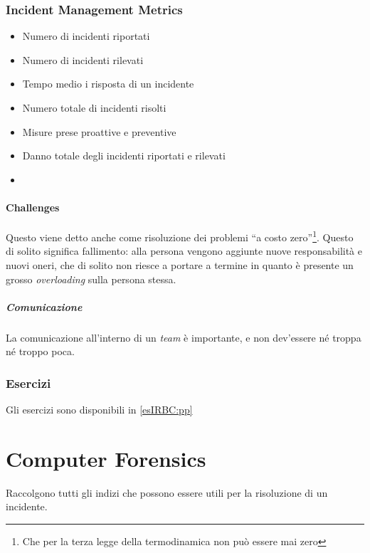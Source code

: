 \subsection{Incident Management Metrics}
\begin{itemize}
\item Numero di incidenti riportati
\item Numero di incidenti rilevati
\item Tempo medio i risposta di un incidente
\item Numero totale di incidenti risolti
\item Misure prese proattive e preventive
\item Danno totale degli incidenti riportati e rilevati
\item {}
\end{itemize}

\subsubsection{Challenges} %

Questo viene detto anche come risoluzione dei problemi ``a costo
zero''\footnote{Che per la terza legge della termodinamica non può essere mai
zero}. Questo di solito significa fallimento: alla persona vengono aggiunte
nuove responsabilità e nuovi oneri, che di solito non riesce a portare a termine
in quanto è presente un grosso \textit{overloading} sulla persona stessa.

\paragraph*{Comunicazione} La comunicazione all'interno di un \textit{team} è
importante, e non dev'essere né troppa né troppo poca.

\subsection{Esercizi}

Gli esercizi sono disponibili in \ref{esIRBC:pp}

\chapter{Computer Forensics}
\label{IRBC:cf}

Raccolgono tutti gli indizi che possono essere utili per la risoluzione di un
incidente.

